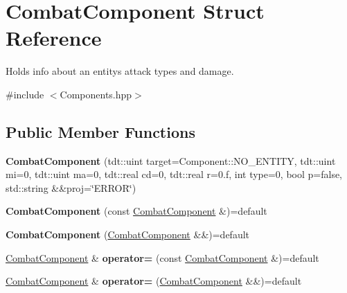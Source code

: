 \hypertarget{struct_combat_component}{}\section{Combat\+Component Struct Reference}
\label{struct_combat_component}


Holds info about an entity\textquotesingle{}s attack types and damage.  




{\ttfamily \#include $<$Components.\+hpp$>$}

\subsection*{Public Member Functions}
\begin{DoxyCompactItemize}
\item 
{\bfseries Combat\+Component} (tdt\+::uint target=Component\+::\+N\+O\+\_\+\+E\+N\+T\+I\+TY, tdt\+::uint mi=0, tdt\+::uint ma=0, tdt\+::real cd=0, tdt\+::real r=0.f, int type=0, bool p=false, std\+::string \&\&proj=\char`\"{}E\+R\+R\+OR\char`\"{})\hypertarget{struct_combat_component_aae9c2d5687acdf46ecb44fb7d1cd9be9}{}\label{struct_combat_component_aae9c2d5687acdf46ecb44fb7d1cd9be9}

\item 
{\bfseries Combat\+Component} (const \hyperlink{struct_combat_component}{Combat\+Component} \&)=default\hypertarget{struct_combat_component_a8832a7015ab552048706adc8e435df5e}{}\label{struct_combat_component_a8832a7015ab552048706adc8e435df5e}

\item 
{\bfseries Combat\+Component} (\hyperlink{struct_combat_component}{Combat\+Component} \&\&)=default\hypertarget{struct_combat_component_abf6bcba235a38dd8c58ee9fb53ca0b44}{}\label{struct_combat_component_abf6bcba235a38dd8c58ee9fb53ca0b44}

\item 
\hyperlink{struct_combat_component}{Combat\+Component} \& {\bfseries operator=} (const \hyperlink{struct_combat_component}{Combat\+Component} \&)=default\hypertarget{struct_combat_component_ac435e7b2177785a9caa63d09c3a4e190}{}\label{struct_combat_component_ac435e7b2177785a9caa63d09c3a4e190}

\item 
\hyperlink{struct_combat_component}{Combat\+Component} \& {\bfseries operator=} (\hyperlink{struct_combat_component}{Combat\+Component} \&\&)=default\hypertarget{struct_combat_component_aaf17c2636d1d400086595818b53ff370}{}\label{struct_combat_component_aaf17c2636d1d400086595818b53ff370}

\end{DoxyCompactItemize}
